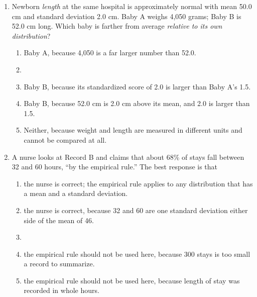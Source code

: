 \begin{enumerate}[leftmargin=1.9em, itemsep=0.13in]
  \boxguard[12]
  \item Newborn \emph{length} at the same hospital is approximately normal with mean 50.0 cm and
        standard deviation 2.0 cm. Baby A weighs 4,050 grams; Baby B is 52.0 cm long. Which baby
        is farther from average \emph{relative to its own distribution}?
        \begin{enumerate}[label=\textbf{(\Alph*)}, leftmargin=2.2em, itemsep=2pt]
          \item Baby A, because 4,050 is a far larger number than 52.0.
          \item {}
          \item Baby B, because its standardized score of 2.0 is larger than Baby A's 1.5.
          \item Baby B, because 52.0 cm is 2.0 cm above its mean, and 2.0 is larger than 1.5.
          \item Neither, because weight and length are measured in different units and cannot be
                compared at all.
                      \rule{0pt}{0.3in}\hfill{}
        \end{enumerate}

  \item A nurse looks at Record B and claims that about 68\% of stays fall between 32 and 60
        hours, ``by the empirical rule.'' The best response is that
        \begin{enumerate}[label=\textbf{(\Alph*)}, leftmargin=2.2em, itemsep=2pt]
          \item the nurse is correct; the empirical rule applies to any distribution that has a
                mean and a standard deviation.
          \item the nurse is correct, because 32 and 60 are one standard deviation either side
                of the mean of 46.
          \item {}
          \item the empirical rule should not be used here, because 300 stays is too small a
                record to summarize.
          \item the empirical rule should not be used here, because length of stay was recorded
                in whole hours.
                      \rule{0pt}{0.3in}\hfill{}
        \end{enumerate}

\end{enumerate}

